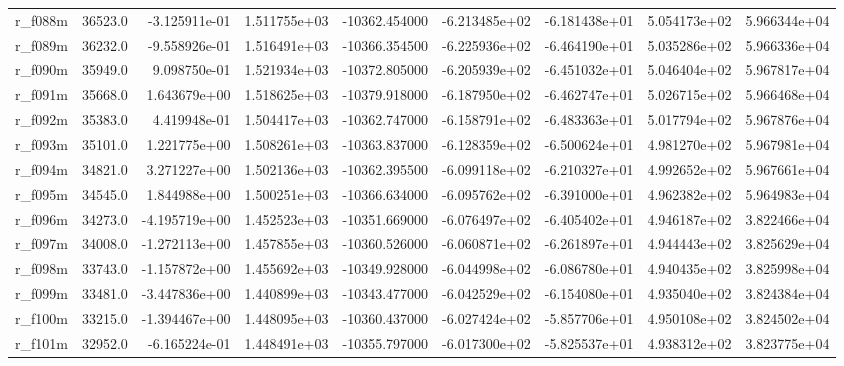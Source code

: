 \documentclass[10pt]{article}
\begin{document}
\begin{landscape}
\begin{longtable}{lrrrrrrrr}
r\_f088m                 &   36523.0 & -3.125911e-01 &  1.511755e+03 & -10362.454000 & -6.213485e+02 & -6.181438e+01 &  5.054173e+02 &  5.966344e+04 \\
r\_f089m                 &   36232.0 & -9.558926e-01 &  1.516491e+03 & -10366.354500 & -6.225936e+02 & -6.464190e+01 &  5.035286e+02 &  5.966336e+04 \\
r\_f090m                 &   35949.0 &  9.098750e-01 &  1.521934e+03 & -10372.805000 & -6.205939e+02 & -6.451032e+01 &  5.046404e+02 &  5.967817e+04 \\
r\_f091m                 &   35668.0 &  1.643679e+00 &  1.518625e+03 & -10379.918000 & -6.187950e+02 & -6.462747e+01 &  5.026715e+02 &  5.966468e+04 \\
r\_f092m                 &   35383.0 &  4.419948e-01 &  1.504417e+03 & -10362.747000 & -6.158791e+02 & -6.483363e+01 &  5.017794e+02 &  5.967876e+04 \\
r\_f093m                 &   35101.0 &  1.221775e+00 &  1.508261e+03 & -10363.837000 & -6.128359e+02 & -6.500624e+01 &  4.981270e+02 &  5.967981e+04 \\
r\_f094m                 &   34821.0 &  3.271227e+00 &  1.502136e+03 & -10362.395500 & -6.099118e+02 & -6.210327e+01 &  4.992652e+02 &  5.967661e+04 \\
r\_f095m                 &   34545.0 &  1.844988e+00 &  1.500251e+03 & -10366.634000 & -6.095762e+02 & -6.391000e+01 &  4.962382e+02 &  5.964983e+04 \\
r\_f096m                 &   34273.0 & -4.195719e+00 &  1.452523e+03 & -10351.669000 & -6.076497e+02 & -6.405402e+01 &  4.946187e+02 &  3.822466e+04 \\
r\_f097m                 &   34008.0 & -1.272113e+00 &  1.457855e+03 & -10360.526000 & -6.060871e+02 & -6.261897e+01 &  4.944443e+02 &  3.825629e+04 \\
r\_f098m                 &   33743.0 & -1.157872e+00 &  1.455692e+03 & -10349.928000 & -6.044998e+02 & -6.086780e+01 &  4.940435e+02 &  3.825998e+04 \\
r\_f099m                 &   33481.0 & -3.447836e+00 &  1.440899e+03 & -10343.477000 & -6.042529e+02 & -6.154080e+01 &  4.935040e+02 &  3.824384e+04 \\
r\_f100m                 &   33215.0 & -1.394467e+00 &  1.448095e+03 & -10360.437000 & -6.027424e+02 & -5.857706e+01 &  4.950108e+02 &  3.824502e+04 \\
r\_f101m                 &   32952.0 & -6.165224e-01 &  1.448491e+03 & -10355.797000 & -6.017300e+02 & -5.825537e+01 &  4.938312e+02 &  3.823775e+04 \\

\end{longtable}
\end{landscape}
\end{document}
